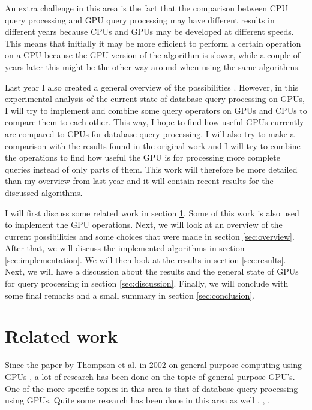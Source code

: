 \documentclass[a4paper,titlepage]{article}
\begin{document}
An extra challenge in this area is the fact that the comparison between CPU query processing and GPU query processing may have different results in different years because CPUs and GPUs may be developed at different speeds. This means that initially it may be more efficient to perform a certain operation on a CPU because the GPU version of the algorithm is slower, while a couple of years later this might be the other way around when using the same algorithms.

Last year I also created a general overview of the possibilities \cite{kostjens2015}. However, in this experimental analysis of the current state of database query processing on GPUs, I will try to implement and combine some query operators on GPUs and CPUs to compare them to each other. This way, I hope to find how useful GPUs currently are compared to CPUs for database query processing. I will also try to make a comparison with the results found in the original work and I will try to combine the operations to find how useful the GPU is for processing more complete queries instead of only parts of them. This work will therefore be more detailed than my overview from last year and it will contain recent results for the discussed algorithms.


I will first discuss some related work in section \ref{sec:related-work}. Some of this work is also used to implement the GPU operations. Next, we will look at an overview of the current possibilities and some choices that were made in section \ref{sec:overview}. After that, we will discuss the implemented algorithms in section \ref{sec:implementation}. We will then look at the results in section \ref{sec:results}. Next, we will have a discussion about the results and the general state of GPUs for query processing in section \ref{sec:discussion}. Finally, we will conclude with some final remarks and a small summary in section \ref{sec:conclusion}.

\section{Related work}
\label{sec:related-work}
Since the paper by Thompson et al. in 2002 on general purpose computing using GPUs \cite{thompson2002}, a lot of research has been done on the topic of general purpose GPU's. One of the more specific topics in this area is that of database query processing using GPUs. Quite some research has been done in this area as well \cite{bakkum2010}, \cite{fang2007}, \cite{kaldeway2010}. 
\end{document}
